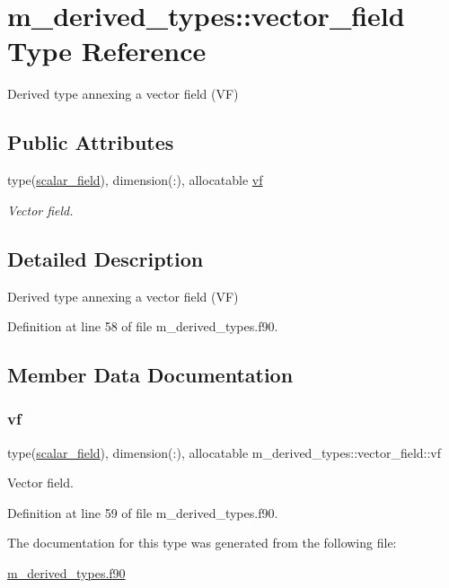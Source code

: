 \hypertarget{structm__derived__types_1_1vector__field}{}\section{m\+\_\+derived\+\_\+types\+:\+:vector\+\_\+field Type Reference}
\label{structm__derived__types_1_1vector__field}


Derived type annexing a vector field (VF)  


\subsection*{Public Attributes}
\begin{DoxyCompactItemize}
\item 
type(\hyperlink{structm__derived__types_1_1scalar__field}{scalar\+\_\+field}), dimension(\+:), allocatable \hyperlink{structm__derived__types_1_1vector__field_a0d280a8c838b68b70c4aca281de74141}{vf}
\begin{DoxyCompactList}\small\item\em Vector field. \end{DoxyCompactList}\end{DoxyCompactItemize}


\subsection{Detailed Description}
Derived type annexing a vector field (VF) 

Definition at line 58 of file m\+\_\+derived\+\_\+types.\+f90.



\subsection{Member Data Documentation}
\mbox{\label{structm__derived__types_1_1vector__field_a0d280a8c838b68b70c4aca281de74141}} 
\subsubsection{\texorpdfstring{vf}{vf}}
{\footnotesize\ttfamily type(\hyperlink{structm__derived__types_1_1scalar__field}{scalar\+\_\+field}), dimension(\+:), allocatable m\+\_\+derived\+\_\+types\+::vector\+\_\+field\+::vf}



Vector field. 



Definition at line 59 of file m\+\_\+derived\+\_\+types.\+f90.



The documentation for this type was generated from the following file\+:\begin{DoxyCompactItemize}
\item 
\hyperlink{m__derived__types_8f90}{m\+\_\+derived\+\_\+types.\+f90}\end{DoxyCompactItemize}
